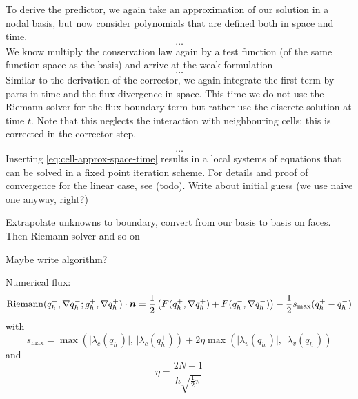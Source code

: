To derive the predictor, we again take an approximation of our solution in a nodal basis, but now consider polynomials that are defined both in space and time.
\begin{equation}
  \ldots
\end{equation}
We know multiply the conservation law again by a test function (of the same function space as the basis) and arrive at the weak formulation
\begin{equation}
  \label{eq:weak-pde-space-time}
 \ldots
\end{equation}
Similar to the derivation of the corrector, we again integrate the first term by parts in time and the flux divergence in space.
This time we do not use the Riemann solver for the flux boundary term but rather use the discrete solution at time $t$.
Note that this neglects the interaction with neighbouring cells; this is corrected in the corrector step.

\begin{equation}
  \label{eq:space-time-predictor}
  \ldots
\end{equation}
Inserting \cref{eq:cell-approx-space-time} results in a local systems of equations that can be solved in a fixed point iteration scheme.
For details and proof of convergence for the linear case, see (todo).
Write about initial guess (we use naive one anyway, right?)

Extrapolate unknowns to boundary, convert from our basis to basis on faces.
Then Riemann solver
and so on

Maybe write algorithm?




Numerical flux:
\begin{equation}
  \label{eq:rusanov-flux}
  \operatorname{Riemann}(q_h^-, \nabla q_h^-; g_h^+, \nabla q_h^+) \cdot \bm{n} =
  \frac{1}{2} \left(
    F(q_h^+, \nabla q_h^+) +
    F(q_h^-, \nabla q_h^-)
  \right) -
  \frac{1}{2} s_\text{max} (q_h^+ - q_h^-)
\end{equation}
with
\begin{equation}
  \label{eq:parabolic-penalty}
  s_\text{max}  = \max \left(
\vert \lambda_c(q_h^-) \vert, \, \vert \lambda_c(q_h^+)
\right) +
2 \eta \max \left(
\vert \lambda_v(q_h^-) \vert, \, \vert \lambda_v(q_h^+)
\right)
\end{equation}
and
\begin{equation}
  \eta = \frac{2N+1}{h \sqrt{\frac{1}{2} \pi}}
\end{equation}

